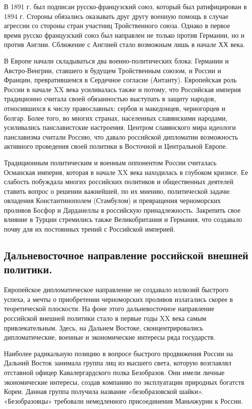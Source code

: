 \documentclass[12pt]{article}
\begin{document}
В 1891 г. был подписан русско-французский союз, который был ратифицирован в 1894 г. Стороны обязались оказывать друг другу военную помощь в случае агрессии со стороны стран участниц Тройственного союза. Однако в первое время русско французский союз был направлен не только против Германии, но и против Англии. Сближение с Англией стало возможным лишь в начале ХХ века.

В Европе начали складываться два военно-политических блока: Германии и Австро-Венгрии, ставшего в будущем Тройственным союзом, и России и Франции, превратившемся в Сердечное согласие (Антанту). Европейская роль России в начале XX века усиливалась также и потому, что Российская империя традиционно считала своей обязанностью выступать в защиту народов, относившихся к числу православных: сербов и македонцев, черногорцев и болгар. Более того, во многих странах, населенных славянскими народами, усиливались панславистские настроения. Центром славянского мира идеологи панславизма считали Россию, что давало российской дипломатии возможность активного проведения своей политики в Восточной и Центральной Европе.

Традиционным политическим и военным оппонентом России считалась Османская империя, которая в начале XX века находилась в глубоком кризисе. Ее слабость побуждала многих российских политиков и общественных деятелей ставить вопрос о решении важнейшей, по их мнению, политической задачи: овладения Константинополем (Стамбулом) и превращения черноморских проливов Босфор и Дарданеллы в российскую принадлежность. Закрепить свое влияние в Турции стремились также Великобритания и Германия, что создавало почву для их постоянных трений с Российской империей.

\newpage
\subsection{ Дальневосточное направление российской внешней политики.}
 
Европейское дипломатическое направление не создавало иллюзий быстрого успеха, а мечты о приобретении черноморских проливов излагались скорее в теоретической плоскости. На фоне этого дальневосточное направление российской внешней политики стало в первые годы XX века самым привлекательным. Здесь, на Дальнем Востоке, сконцентрировались дипломатические, военные и экономические интересы ряда государств.

Наиболее радикальную позицию в вопросе быстрого продвижения России на Дальний Восток занимала группа лиц из высшего света, которую возглавлял отставной офицер Кавалергардского полка Безобразов. Они имели личные экономические интересы, создав компанию по эксплуатации природных богатств Кореи. Данная группа получила название «безобразовской шайки». «Безобразовцы» требовали немедленного присоединения Маньчжурии к России.
\end{document}
